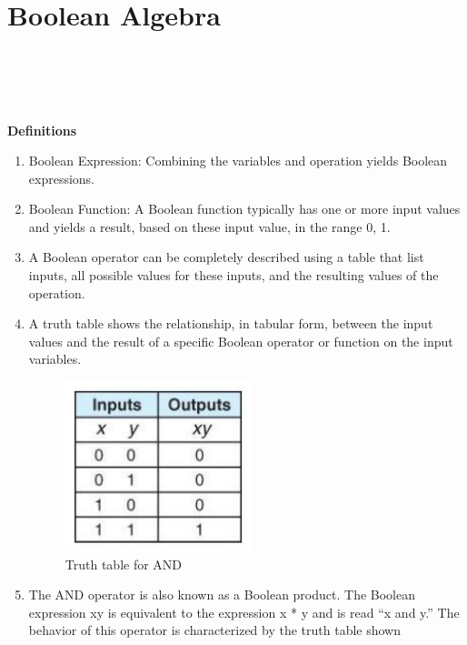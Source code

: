 \documentclass[12pt]{report}
\begin{document}
    \section*{Boolean Algebra}
        \\
        \\
        \\
        \text{ }\\

        \textbf{Definitions} \\
        \begin{enumerate}
            \item Boolean Expression: Combining the variables and operation yields Boolean
            expressions.
            \item Boolean Function: A Boolean function typically has one or more input
            values and yields a result, based on these input value, in the range 0, 1.
            \item A Boolean operator can be completely described using a table that list
            inputs, all possible values for these inputs, and the resulting values of
            the operation.
            \item A truth table shows the relationship, in tabular form, between the input
            values and the result of a specific Boolean operator or function on the
            input variables.
                \begin{figure}[h!]
                    \includegraphics[width=0.3\linewidth]{AND_tt.png}
                    \caption{Truth table for AND}
                \end{figure}
            \item The AND operator is also known as a Boolean product. The Boolean
            expression xy is equivalent to the expression x * y and is read “x and y.”
            The behavior of this operator is characterized by the truth table shown

\end{enumerate}
\end{document}
